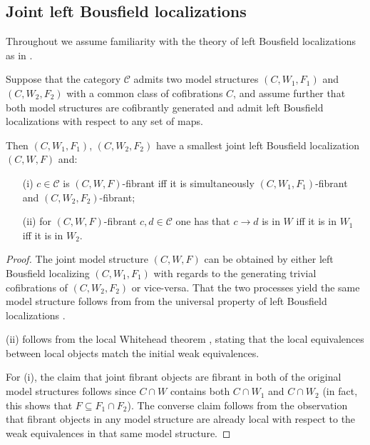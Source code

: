 \documentclass[a4paper,10pt
,draft
]{article}%
\begin{document}



\subsection{Joint left Bousfield localizations}\label{JOINBOUS SEC}

Throughout we assume familiarity with the theory of left Bousfield localizations as in \cite{Hir03}.

\begin{proposition}\label{COMBMODSTR PROP}
	Suppose that the category $\mathcal{C}$
	admits two model structures $(C,W_1,F_1)$ and $(C,W_2,F_2)$
	with a common class of cofibrations $C$,
	and assume further that both model structures are cofibrantly generated and admit left Bousfield localizations with respect to any set of maps.
	
	Then $(C,W_1,F_1)$, $(C,W_2,F_2)$ have a smallest joint left Bousfield localization 
	$(C,W,F)$ and:
\begin{itemize}
	\item[(i)] $c \in \mathcal{C}$ is $(C,W,F)$-fibrant iff it is simultaneously 
	$(C,W_1,F_1)$-fibrant and $(C,W_2,F_2)$-fibrant;
	\item[(ii)] for $(C,W,F)$-fibrant  
	$c,d \in \mathcal{C}$ one has that $c\to d$ is in $W$ iff it is in $W_1$ iff it is in $W_2$.
\end{itemize}
\end{proposition}


\begin{proof}
	The joint model structure $(C,W,F)$ can be obtained by either left Bousfield localizing $(C,W_1,F_1)$ with regards to the generating trivial cofibrations of $(C,W_2,F_2)$ or vice-versa. That the two processes yield the same model structure follows from from the universal property of left Bousfield localizations \cite[Prop. 3.4.18]{Hir03}.
	
	(ii) follows from the local Whitehead theorem \cite[Thm. 3.3.8]{Hir03}, stating that
the local equivalences between local objects match the
initial weak equivalences.

For (i), the claim that joint fibrant objects are fibrant in both of the original model structures follows since $C \cap W$ contains both $C \cap W_1$ and $C \cap W_2$ (in fact, this shows that $F \subseteq F_1 \cap F_2$).
The converse claim follows from the observation that fibrant objects in any model structure are already local with respect to the weak equivalences in that same model structure.
\end{proof}
\end{document}
